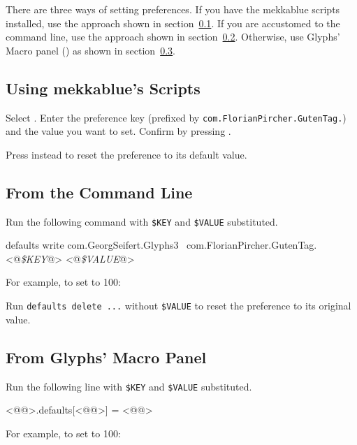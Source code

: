 There are three ways of setting preferences.
If you have the mekkablue scripts installed, use the approach shown in section~\ref{sub:using_mekkablue_s_scripts}.
If you are accustomed to the command line, use the approach shown in section~\ref{sub:from_the_command_line}.
Otherwise, use Glyphs’ Macro panel () as shown in section~\ref{sub:from_glyphs_s_macro_panel}.

\subsection{Using mekkablue’s Scripts}%
\label{sub:using_mekkablue_s_scripts}

Select .
Enter the preference key (prefixed by \texttt{com.FlorianPircher.GutenTag.}) and the value you want to set.
Confirm by pressing .


\noindent Press  instead to reset the preference to its default value.

\subsection{From the Command Line}%
\label{sub:from_the_command_line}

Run the following command with \texttt{\$KEY} and \texttt{\$VALUE} substituted.

\begin{RichListing}
defaults write com.GeorgSeifert.Glyphs3 \
  com.FlorianPircher.GutenTag.<@\textit{\$KEY}@> <@\textit{\$VALUE}@>
\end{RichListing}
%
For example, to set  to 100:


\noindent Run \texttt{defaults delete ...} without \texttt{\$VALUE} to reset the preference to its original value.

\subsection{From Glyphs’ Macro Panel}%
\label{sub:from_glyphs_s_macro_panel}

Run the following line with \texttt{\$KEY} and \texttt{\$VALUE} substituted.

\begin{RichListing}
<@@>.defaults[<@@>] = <@@>
\end{RichListing}
%
For example, to set  to 100:

